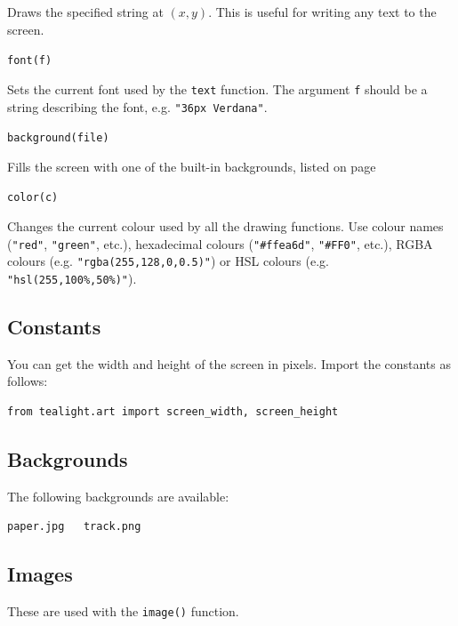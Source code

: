 \documentclass[12pt,a4paper,twoside]{article}
\renewcommand{\_}{\texttt{\symbol{95}}}
\begin{document}
\begin{bulletlist}
	Draws the specified string at $(x,y)$. This is useful for writing any text to the screen.

\item \verb^font(f)^

	Sets the current font used by the \verb^text^ function. The argument \verb^f^ should be a string describing the font, e.g. \verb^"36px Verdana"^.

\item \verb^background(file)^

	Fills the screen with one of the built-in backgrounds, listed on page \pageref{backgrounds}
\item \verb^color(c)^

	Changes the current colour used by all the drawing functions. Use colour names (\verb^"red"^, \verb^"green"^, etc.), hexadecimal colours (\verb^"#ffea6d"^, \verb^"#FF0"^, etc.), RGBA colours (e.g. \verb^"rgba(255,128,0,0.5)"^) or HSL colours (e.g. \verb^"hsl(255,100%,50%)"^).
\end{bulletlist}

\subsection{Constants}

You can get the width and height of the screen in pixels. Import the constants as follows:
\begin{verbatim}
from tealight.art import screen_width, screen_height
\end{verbatim}


\subsection{Backgrounds}
\label{backgrounds}

The following backgrounds are available:
\begin{verbatim}
paper.jpg   track.png
\end{verbatim}

\newpage
\subsection{Images}

These are used with the \verb^image()^ function.
\end{document}

